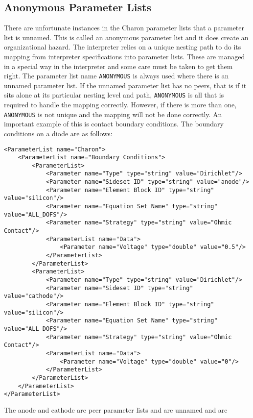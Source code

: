 \subsection{Anonymous Parameter Lists}

There are unfortunate instances in the Charon parameter lists that a
parameter list is unnamed.  This is called an anonymous parameter list
and it does create an organizational hazard.  The interpreter relies
on a unique nesting path to do its mapping from interpreter
specifications into parameter lists.  These are managed in a special
way in the interpreter and some care must be taken to get them right.
The parameter list name \texttt{ANONYMOUS} is always used where there
is an unnamed parameter list.  If the unnamed parameter list has no
peers, that is if it sits alone at its particular nesting level and
path, \texttt{ANONYMOUS} is all that is required to handle the mapping
correctly.  However, if there is more than one, \texttt{ANONYMOUS} is
not unique and the mapping will not be done correctly.  An important
example of this is contact boundary conditions.  The boundary
conditions on a diode are as follows:
\begin{lstlisting}
<ParameterList name="Charon">
    <ParameterList name="Boundary Conditions">
        <ParameterList>
            <Parameter name="Type" type="string" value="Dirichlet"/> 
            <Parameter name="Sideset ID" type="string" value="anode"/> 
            <Parameter name="Element Block ID" type="string" value="silicon"/> 
            <Parameter name="Equation Set Name" type="string" value="ALL_DOFS"/> 
            <Parameter name="Strategy" type="string" value="Ohmic Contact"/> 
            <ParameterList name="Data">
                <Parameter name="Voltage" type="double" value="0.5"/>
            </ParameterList>
        </ParameterList>    
        <ParameterList>
            <Parameter name="Type" type="string" value="Dirichlet"/> 
            <Parameter name="Sideset ID" type="string" value="cathode"/> 
            <Parameter name="Element Block ID" type="string" value="silicon"/> 
            <Parameter name="Equation Set Name" type="string" value="ALL_DOFS"/> 
            <Parameter name="Strategy" type="string" value="Ohmic Contact"/>
            <ParameterList name="Data">
                <Parameter name="Voltage" type="double" value="0"/>
            </ParameterList>
        </ParameterList>
    </ParameterList>
</ParameterList>
\end{lstlisting}
The anode and cathode are peer parameter lists and are unnamed and are
